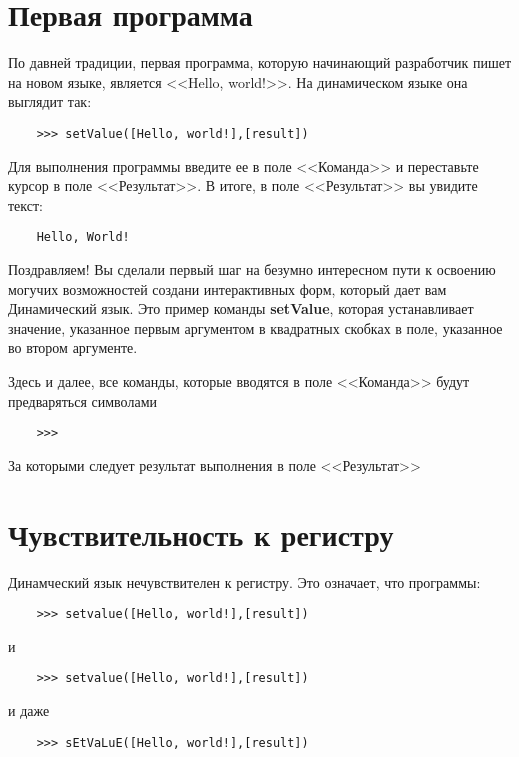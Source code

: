 \documentclass[../index.tex]{subfiles}
\begin{document}
	\section{Первая программа}
	
	По давней традиции, первая программа, которую начинающий разработчик пишет на новом языке, является <<Hello, world!>>. На динамическом языке она выглядит так:
	\begin{verbatim}
	>>> setValue([Hello, world!],[result])
	\end{verbatim}
	
	Для выполнения программы введите ее в поле <<Команда>> и переставьте курсор в поле <<Результат>>. В итоге, в поле <<Результат>> вы увидите текст:
	
	\begin{verbatim}
	Hello, World!
	\end{verbatim}
	
	Поздравляем! Вы сделали первый шаг на безумно интересном пути к освоению могучих возможностей создани интерактивных форм, который дает вам Динамический язык.
	Это пример команды {\bf setValue}, которая устанавливает значение, указанное первым аргументом в квадратных скобках в поле, указанное во втором аргументе.
	
	Здесь и далее, все команды, которые вводятся в поле <<Команда>> будут предваряться символами 	\begin{verbatim}
	>>>
	\end{verbatim}	За которыми следует результат выполнения в поле <<Результат>>
	
	\section{Чувствительность к регистру}
	
	Динамческий язык нечувствителен к регистру. Это означает, что программы:
	
	\begin{verbatim}
	>>> setvalue([Hello, world!],[result])
	\end{verbatim}
	
	и
	
	\begin{verbatim}
	>>> setvalue([Hello, world!],[result])
	\end{verbatim}
	
	и даже
	
	\begin{verbatim}
	>>> sEtVaLuE([Hello, world!],[result])
	\end{verbatim}
	
\end{document}
